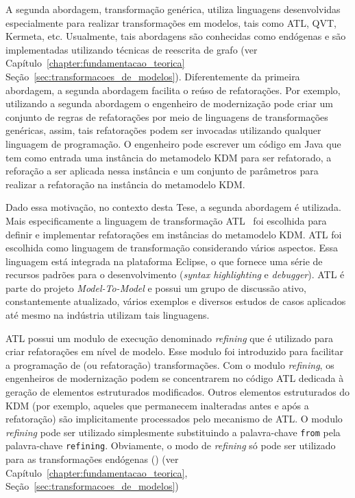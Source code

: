 A segunda abordagem, transformação genérica, utiliza linguagens desenvolvidas especialmente para realizar transformações em modelos, tais como ATL, QVT, Kermeta, etc. Usualmente, tais abordagens são conhecidas como endógenas e são implementadas utilizando técnicas de reescrita de grafo (ver Capítulo~\ref{chapter:fundamentacao_teorica} Seção~\ref{sec:transformacoes_de_modelos}). Diferentemente da primeira abordagem, a segunda abordagem facilita o reúso de refatorações. Por exemplo, utilizando a segunda abordagem o engenheiro de modernização pode criar um conjunto de regras de refatorações por meio de linguagens de transformações genéricas, assim, tais refatorações podem ser invocadas utilizando qualquer linguagem de programação. O engenheiro pode escrever um código em Java que tem como entrada uma instância do metamodelo KDM para ser refatorado, a reforação a ser aplicada nessa instância e um conjunto de parâmetros para realizar a refatoração na instância do metamodelo KDM.

Dado essa motivação, no contexto desta Tese, a segunda abordagem é utilizada. Mais especificamente a linguagem de transformação ATL~\cite{ATL_eclipse,Jouault_2008} foi escolhida para definir e implementar refatorações em instâncias do metamodelo KDM. ATL foi escolhida como linguagem de transformação considerando vários aspectos. Essa linguagem está integrada na plataforma Eclipse, o que fornece uma série de recursos padrões para o desenvolvimento (\textit{syntax highlighting} e \textit{debugger}). ATL é parte do projeto \textit{Model-To-Model} e possui um grupo de discussão ativo, constantemente atualizado, vários exemplos e diversos estudos de casos aplicados até mesmo na indústria utilizam tais linguagens.


ATL possui um modulo de execução denominado \textit{refining} que é utilizado para criar refatorações em nível de modelo. Esse modulo foi introduzido para facilitar a programação de (ou refatoração) transformações. Com o modulo \textit{refining}, os engenheiros de modernização podem se concentrarem no código ATL dedicada à geração de elementos estruturados modificados. Outros elementos estruturados do KDM (por exemplo, aqueles que permanecem inalteradas antes e após a refatoração) são implicitamente processados pelo mecanismo de ATL. O modulo \textit{refining} pode ser utilizado simplesmente substituindo a palavra-chave \texttt{from} pela palavra-chave \texttt{refining}. Obviamente, o modo de \textit{refining} só pode ser utilizado para as transformações endógenas () (ver Capítulo~\ref{chapter:fundamentacao_teorica}, Seção~\ref{sec:transformacoes_de_modelos})


